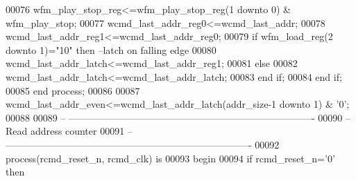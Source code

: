 \begin{DoxyCode}
00076             \textcolor{vhdlchar}{wfm_play_stop_reg}\textcolor{vhdlchar}{<=}\textcolor{vhdlchar}{wfm_play_stop_reg}\textcolor{vhdlchar}{(}\textcolor{vhdllogic}{}\textcolor{vhdllogic}{1} \textcolor{keywordflow}{downto} \textcolor{vhdllogic}{}\textcolor{vhdllogic}{0}\textcolor{vhdlchar}{)} \textcolor{vhdlchar}{&} \textcolor{vhdlchar}{wfm_play_stop};
00077             \textcolor{vhdlchar}{wcmd_last_addr_reg0}\textcolor{vhdlchar}{<=}\textcolor{vhdlchar}{wcmd_last_addr};
00078             \textcolor{vhdlchar}{wcmd_last_addr_reg1}\textcolor{vhdlchar}{<=}\textcolor{vhdlchar}{wcmd_last_addr_reg0};
00079             \textcolor{keywordflow}{if} \textcolor{vhdlchar}{wfm_load_reg}\textcolor{vhdlchar}{(}\textcolor{vhdllogic}{}\textcolor{vhdllogic}{2} \textcolor{keywordflow}{downto} \textcolor{vhdllogic}{}\textcolor{vhdllogic}{1}\textcolor{vhdlchar}{)}\textcolor{vhdlchar}{=}\textcolor{vhdllogic}{"10"} \textcolor{keywordflow}{then}\textcolor{keyword}{ --latch on falling edge}
00080                 \textcolor{vhdlchar}{wcmd_last_addr_latch}\textcolor{vhdlchar}{<=}\textcolor{vhdlchar}{wcmd_last_addr_reg1};
00081             \textcolor{keywordflow}{else} 
00082                  \textcolor{vhdlchar}{wcmd_last_addr_latch}\textcolor{vhdlchar}{<=}\textcolor{vhdlchar}{wcmd_last_addr_latch};
00083             \textcolor{keywordflow}{end} \textcolor{keywordflow}{if};
00084         \textcolor{keywordflow}{end} \textcolor{keywordflow}{if};
00085 \textcolor{keywordflow}{end} \textcolor{keywordflow}{process};
00086 
00087 \textcolor{vhdlchar}{wcmd_last_addr_even}\textcolor{vhdlchar}{<=}\textcolor{vhdlchar}{wcmd_last_addr_latch}\textcolor{vhdlchar}{(}\textcolor{vhdlchar}{addr_size}\textcolor{vhdlchar}{-}\textcolor{vhdllogic}{}\textcolor{vhdllogic}{1} \textcolor{keywordflow}{downto} \textcolor{vhdllogic}{}\textcolor{vhdllogic}{1}\textcolor{vhdlchar}{)} \textcolor{vhdlchar}{&} \textcolor{vhdlchar}{'}\textcolor{vhdllogic}{}\textcolor{vhdllogic}{0}\textcolor{vhdlchar}{'};
00088 
00089 \textcolor{keyword}{-- ----------------------------------------------------------------------------}
00090 \textcolor{keyword}{-- Read address counter}
00091 \textcolor{keyword}{-- ----------------------------------------------------------------------------}
00092 \textcolor{keywordflow}{process}(rcmd_reset_n, rcmd_clk) \textcolor{keywordflow}{is} 
00093 \textcolor{vhdlkeyword}{    begin }
00094         \textcolor{keywordflow}{if} \textcolor{vhdlchar}{rcmd_reset_n}\textcolor{vhdlchar}{=}\textcolor{vhdlchar}{'}\textcolor{vhdllogic}{}\textcolor{vhdllogic}{0}\textcolor{vhdlchar}{'} \textcolor{keywordflow}{then} 

\end{DoxyCode}
